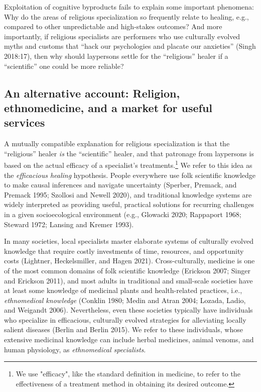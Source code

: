 \documentclass[
  11pt,
]{article}
\begin{document}
Exploitation of cognitive byproducts fails to explain some important phenomena: Why do the areas of religious specialization so frequently relate to healing, e.g., compared to other unpredictable and high-stakes outcomes? And more importantly, if religious specialists are performers who use culturally evolved myths and customs that ``hack our psychologies and placate our anxieties'' (Singh 2018:17), then why should laypersons settle for the ``religious'' healer if a ``scientific'' one could be more reliable?

\hypertarget{an-alternative-account-religion-ethnomedicine-and-a-market-for-useful-services}{%
\subsection{An alternative account: Religion, ethnomedicine, and a market for useful services}\label{an-alternative-account-religion-ethnomedicine-and-a-market-for-useful-services}}

A mutually compatible explanation for religious specialization is that the ``religious'' healer \emph{is} the ``scientific'' healer, and that patronage from laypersons is based on the actual efficacy of a specialist's treatments.\footnote{We use "efficacy", like the standard definition in medicine, to refer to the effectiveness of a treatment method in obtaining its desired outcome.} We refer to this idea as the \emph{efficacious healing} hypothesis. People everywhere use folk scientific knowledge to make causal inferences and navigate uncertainty (Sperber, Premack, and Premack 1995; Szollosi and Newell 2020), and traditional knowledge systems are widely interpreted as providing useful, practical solutions for recurring challenges in a given socioecological environment (e.g., Glowacki 2020; Rappaport 1968; Steward 1972; Lansing and Kremer 1993).

In many societies, local specialists master elaborate systems of culturally evolved knowledge that require costly investments of time, resources, and opportunity costs (Lightner, Heckelsmiller, and Hagen 2021). Cross-culturally, medicine is one of the most common domains of folk scientific knowledge (Erickson 2007; Singer and Erickson 2011), and most adults in traditional and small-scale societies have at least some knowledge of medicinal plants and health-related practices, i.e., \emph{ethnomedical knowledge} (Conklin 1980; Medin and Atran 2004; Lozada, Ladio, and Weigandt 2006). Nevertheless, even these societies typically have individuals who specialize in efficacious, culturally evolved strategies for alleviating locally salient diseases (Berlin and Berlin 2015). We refer to these individuals, whose extensive medicinal knowledge can include herbal medicines, animal venoms, and human physiology, as \emph{ethnomedical specialists}.
\end{document}
